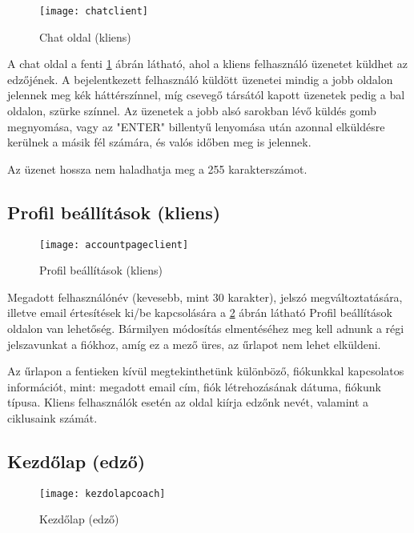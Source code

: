 \begin{figure}[H]
	\centering
	\texttt{[image: chatclient]}
	\caption{Chat oldal (kliens)}
	\label{fig:chatclient}
\end{figure}

A chat oldal a fenti \ref{fig:chatclient} ábrán látható, ahol a kliens felhasználó üzenetet küldhet az edzőjének. A bejelentkezett felhasználó küldött üzenetei mindig a jobb oldalon jelennek meg kék háttérszínnel, míg csevegő társától kapott üzenetek pedig a bal oldalon, szürke színnel. Az üzenetek a jobb alsó sarokban lévő küldés gomb megnyomása, vagy az "ENTER" billentyű lenyomása után azonnal elküldésre kerülnek a másik fél számára, és valós időben meg is jelennek.

\bigskip

Az üzenet hossza nem haladhatja meg a 255 karakterszámot.

\subsection{Profil beállítások (kliens)}

\begin{figure}[H]
	\centering
	\texttt{[image: accountpageclient]}
	\caption{Profil beállítások (kliens)}
	\label{fig:accountpageclient}
\end{figure}

Megadott felhasználónév (kevesebb, mint 30 karakter), jelszó megváltoztatására, illetve email értesítések ki/be kapcsolására a \ref{fig:accountpageclient} ábrán látható Profil beállítások oldalon van lehetőség. Bármilyen módosítás elmentéséhez meg kell adnunk a régi jelszavunkat a fiókhoz, amíg ez a mező üres, az űrlapot nem lehet elküldeni.

Az űrlapon a fentieken kívül megtekinthetünk különböző, fiókunkkal kapcsolatos információt, mint: megadott email cím, fiók létrehozásának dátuma, fiókunk típusa. Kliens felhasználók esetén az oldal kiírja edzőnk nevét, valamint a ciklusaink számát.

\subsection{Kezdőlap (edző)}

\begin{figure}[H]
	\centering
	\texttt{[image: kezdolapcoach]}
	\caption{Kezdőlap (edző)}
	\label{fig:kezdolapcoach}
\end{figure}

